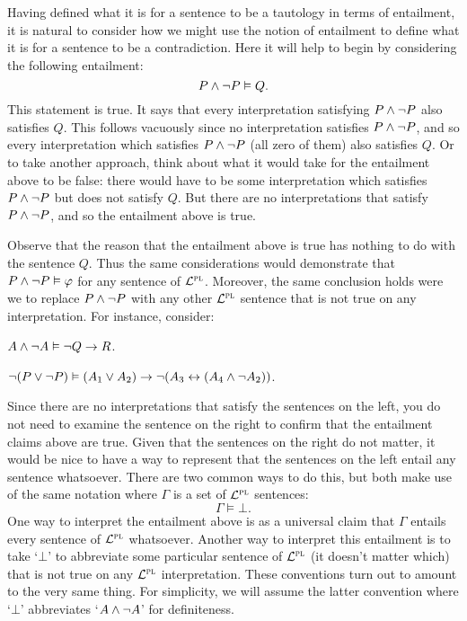 Having defined what it is for a sentence to be a tautology in terms of entailment, it is natural to consider how we might use the notion of entailment to define what it is for a sentence to be a contradiction.
Here it will help to begin by considering the following entailment:
$$P \wedge \neg P \vDash Q.$$
This statement is true.
It says that every interpretation satisfying $P \wedge \neg P$ also satisfies $Q$.
This follows vacuously since no interpretation satisfies $P \wedge \neg P$, and so every interpretation which satisfies $P \wedge \neg P$ (all zero of them) also satisfies $Q$.
Or to take another approach, think about what it would take for the entailment above to be false: there would have to be some interpretation which satisfies $P \wedge \neg P$ but does not satisfy $Q$.
But there are no interpretations that satisfy $P \wedge \neg P$, and so the entailment above is true.

Observe that the reason that the entailment above is true has nothing to do with the sentence $Q$.
Thus the same considerations would demonstrate that $P \wedge \neg P \vDash \varphi$ for any sentence \metaA of $\mathcal{L}^{\textsc{pl}}$.
Moreover, the same conclusion holds were we to replace $P \wedge \neg P$ with any other $\mathcal{L}^{\textsc{pl}}$ sentence that is not true on any interpretation.
For instance, consider:

\begin{earg}
\item[] $A \wedge \neg A \vDash \neg Q \rightarrow R$.
\item[] $\neg (P \vee \neg P) \vDash (A_1 \vee A_2) \rightarrow \neg (A_3 \leftrightarrow (A_4 \wedge \neg A_2))$.
\end{earg}

Since there are no interpretations that satisfy the sentences on the left, you do not need to examine the sentence on the right to confirm that the entailment claims above are true.
Given that the sentences on the right do not matter, it would be nice to have a way to represent that the sentences on the left entail any sentence whatsoever.
There are two common ways to do this, but both make use of the same notation where $\Gamma$ is a set of $\mathcal{L}^{\textsc{pl}}$ sentences:
$$\Gamma \vDash \bot.$$
One way to interpret the entailment above is as a universal claim that $\Gamma$ entails every sentence of $\mathcal{L}^{\textsc{pl}}$ whatsoever. 
Another way to interpret this entailment is to take `$\bot$' to abbreviate some particular sentence of $\mathcal{L}^{\textsc{pl}}$ (it doesn't matter which) that is not true on any $\mathcal{L}^{\textsc{pl}}$ interpretation.
These conventions turn out to amount to the very same thing.
For simplicity, we will assume the latter convention where `$\bot$' abbreviates `$A \wedge \neg A$' for definiteness.


